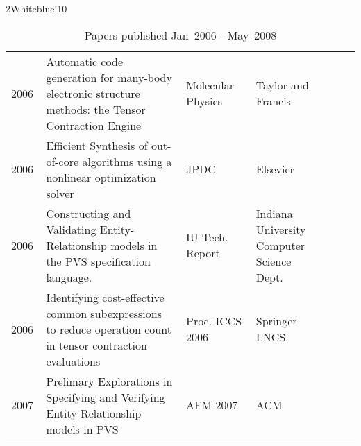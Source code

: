 \documentclass[titlepage, %
11pt, 
]{article}
\begin{document}
\begin{table}
\begin{minipage}{1.0\linewidth}
\rowcolors%
{2}{White}{blue!10}
\setlength\extrarowheight{4pt}
\begin{tabular}%
{|p{0.10\linewidth}|p{0.40\linewidth}|p{0.20\linewidth}|p{0.20\linewidth}|p{0.10\linewidth}|}
\hline
\multicolumn{1}{|m{0.10\linewidth}|}{\centering {\bf Year}}&
\multicolumn{1}{m{0.40\linewidth}|}{\centering {\bf Paper}}&
\multicolumn{1}{m{0.20\linewidth}|}{\centering {\bf Conf. or Journal}}&
\multicolumn{1}{m{0.20\linewidth}|}{\centering {\bf Publisher}}&
\multicolumn{1}{m{0.10\linewidth}|}{\centering {\bf Biblio entry}}\\
\hline
2006 & Automatic code generation for many-body electronic structure methods: the Tensor Contraction Engine & Molecular Physics & Taylor and Francis & \cite{Auer-MolPhysics-2006}\\
2006 &  Efficient Synthesis of out-of-core algorithms using a nonlinear optimization solver & JPDC & Elsevier & \cite{krishnan-et-al-jpdc-2006}\\
2006 & Constructing and Validating Entity-Relationship models in the PVS specification language.& IU Tech. Report  & Indiana University Computer Science Dept. & \cite{choppella-sengupta-robertson-johnson-tr-2006}\\
2006 & Identifying cost-effective common subexpressions to reduce operation count in tensor contraction evaluations& Proc. ICCS 2006 & Springer LNCS & \cite{Hartono-et-al-iccs-2006}\\
2007 & Prelimary Explorations in Specifying and Verifying Entity-Relationship models in PVS& AFM 2007  & ACM & \cite{choppella-et-al-afm07}\\
\hline
\end{tabular}
\end{minipage}
\caption{Papers published Jan~2006 - May~2008\label{tbl:publications-2}}
\end{table}
\end{document}
